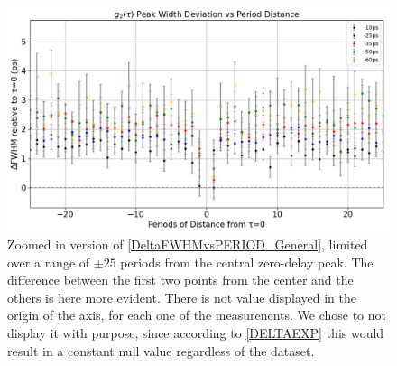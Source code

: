 \begin{figure}[hbtp]
\centering
\includegraphics[width=1\textwidth]{DeltaFWHMvsPeriods_ZOOM.jpg}
\caption{Zoomed in version of \autoref{DeltaFWHMvsPERIOD_General}, limited over a range of $\pm 25$ periods from the central zero-delay peak. The difference between the first two points from the center and the others is here more evident. There is not value displayed in the origin of the axis, for each one of the measurenents. We chose to not display it with purpose, since according to \autoref{DELTAEXP} this would result in a constant null value regardless of the dataset.}
\label{DeltaFWHMvsPERIOD_ZOOM}
\end{figure}

